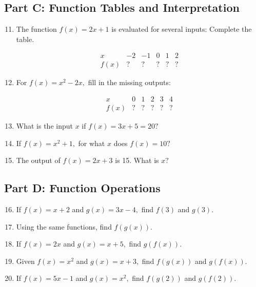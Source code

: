 \documentclass[12pt]{article}
\begin{document}
\subsection*{Part C: Function Tables and Interpretation}
\begin{enumerate}
  \setcounter{enumi}{10}
  \item The function \(f(x) = 2x + 1\) is evaluated for several inputs:  
  Complete the table.  

  \[
  \begin{array}{c|ccccc}
  x & -2 & -1 & 0 & 1 & 2 \\ \hline
  f(x) & ? & ? & ? & ? & ?
  \end{array}
  \]

  \item For \(f(x) = x^2 - 2x,\) fill in the missing outputs:  

  \[
  \begin{array}{c|ccccc}
  x & 0 & 1 & 2 & 3 & 4 \\ \hline
  f(x) & ? & ? & ? & ? & ?
  \end{array}
  \]

  \item What is the input \(x\) if \(f(x) = 3x + 5 = 20?\)
  \item If \(f(x) = x^2 + 1,\) for what \(x\) does \(f(x) = 10?\)
  \item The output of \(f(x) = 2x + 3\) is 15. What is \(x?\)
\end{enumerate}

\subsection*{Part D: Function Operations}
\begin{enumerate}
  \setcounter{enumi}{15}
  \item If \(f(x) = x + 2\) and \(g(x) = 3x - 4,\) find \(f(3)\) and \(g(3).\)
  \item Using the same functions, find \(f(g(x)).\)
  \item If \(f(x) = 2x\) and \(g(x) = x + 5,\) find \(g(f(x)).\)
  \item Given \(f(x) = x^2\) and \(g(x) = x + 3,\) find \(f(g(x))\) and \(g(f(x)).\)
  \item If \(f(x) = 5x - 1\) and \(g(x) = x^2,\) find \(f(g(2))\) and \(g(f(2)).\)
\end{enumerate}
\end{document}
